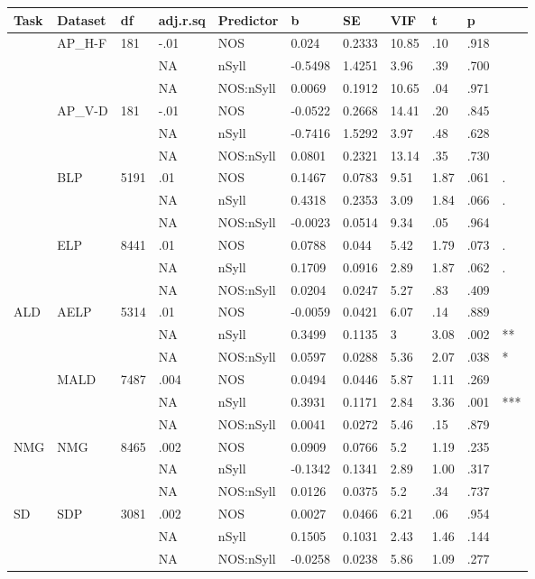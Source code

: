 \begin{table}[ht]
\centering
\begingroup\normalsize
\begin{tabular}{lllllllllll}
  \hline
Task & Dataset & df & adj.r.sq & Predictor & b & SE & VIF & t & p &  \\ 
  \hline
 & AP\_H-F & 181 & -.01 & NOS & 0.024 & 0.2333 & 10.85 & .10 & .918 &   \\ 
   &  &  & NA & nSyll & -0.5498 & 1.4251 & 3.96 & .39 & .700 &   \\ 
   &  &  & NA & NOS:nSyll & 0.0069 & 0.1912 & 10.65 & .04 & .971 &   \\ 
   & AP\_V-D & 181 & -.01 & NOS & -0.0522 & 0.2668 & 14.41 & .20 & .845 &   \\ 
   &  &  & NA & nSyll & -0.7416 & 1.5292 & 3.97 & .48 & .628 &   \\ 
   &  &  & NA & NOS:nSyll & 0.0801 & 0.2321 & 13.14 & .35 & .730 &   \\ 
   & BLP & 5191 & .01 & NOS & 0.1467 & 0.0783 & 9.51 & 1.87 & .061 & . \\ 
   &  &  & NA & nSyll & 0.4318 & 0.2353 & 3.09 & 1.84 & .066 & . \\ 
   &  &  & NA & NOS:nSyll & -0.0023 & 0.0514 & 9.34 & .05 & .964 &   \\ 
   & ELP & 8441 & .01 & NOS & 0.0788 & 0.044 & 5.42 & 1.79 & .073 & . \\ 
   &  &  & NA & nSyll & 0.1709 & 0.0916 & 2.89 & 1.87 & .062 & . \\ 
   &  &  & NA & NOS:nSyll & 0.0204 & 0.0247 & 5.27 & .83 & .409 &   \\ 
  ALD & AELP & 5314 & .01 & NOS & -0.0059 & 0.0421 & 6.07 & .14 & .889 &   \\ 
   &  &  & NA & nSyll & 0.3499 & 0.1135 & 3 & 3.08 & .002 & ** \\ 
   &  &  & NA & NOS:nSyll & 0.0597 & 0.0288 & 5.36 & 2.07 & .038 & * \\ 
   & MALD & 7487 & .004 & NOS & 0.0494 & 0.0446 & 5.87 & 1.11 & .269 &   \\ 
   &  &  & NA & nSyll & 0.3931 & 0.1171 & 2.84 & 3.36 & .001 & *** \\ 
   &  &  & NA & NOS:nSyll & 0.0041 & 0.0272 & 5.46 & .15 & .879 &   \\ 
  NMG & NMG & 8465 & .002 & NOS & 0.0909 & 0.0766 & 5.2 & 1.19 & .235 &   \\ 
   &  &  & NA & nSyll & -0.1342 & 0.1341 & 2.89 & 1.00 & .317 &   \\ 
   &  &  & NA & NOS:nSyll & 0.0126 & 0.0375 & 5.2 & .34 & .737 &   \\ 
  SD & SDP & 3081 & .002 & NOS & 0.0027 & 0.0466 & 6.21 & .06 & .954 &   \\ 
   &  &  & NA & nSyll & 0.1505 & 0.1031 & 2.43 & 1.46 & .144 &   \\ 
   &  &  & NA & NOS:nSyll & -0.0258 & 0.0238 & 5.86 & 1.09 & .277 &   \\ 
   \hline
\end{tabular}
\endgroup
\end{table}
